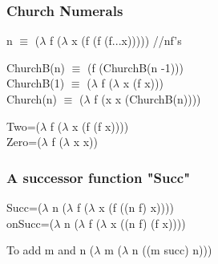 \documentclass{article}
\begin{document}
\subsubsection*{Church Numerals}
\begin{flushleft}
n $\equiv$ ($\lambda$ f ($\lambda$ x (f (f (f...x))))) //nf's
\end{flushleft}

\begin{flushleft}
ChurchB(n) $\equiv$ (f (ChurchB(n -1)))\\
ChurchB(1) $\equiv$ ($\lambda$ f ($\lambda$ x (f x)))\\
Church(n) $\equiv$ ($\lambda$ f (x x (ChurchB(n))))\\
\end{flushleft}

\begin{flushleft}
Two=($\lambda$ f ($\lambda$ x (f (f x))))\\
Zero=($\lambda$ f ($\lambda$ x x))\\
\end{flushleft}
	
\subsubsection*{A successor function "Succ"}
\begin{flushleft}
Succ=($\lambda$ n ($\lambda$ f ($\lambda$ x (f ((n f) x))))\\
onSucc=($\lambda$ n ($\lambda$ f ($\lambda$ x ((n f) (f x))))
\end{flushleft}

\begin{flushleft}
To add m and n ($\lambda$ m ($\lambda$ n ((m succ) n)))
\end{flushleft}
\end{document}
